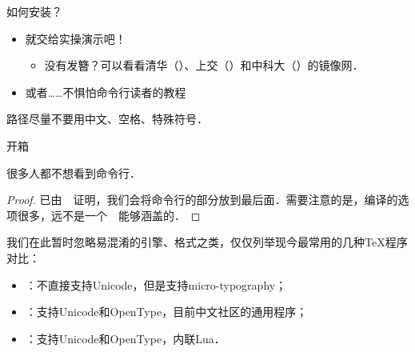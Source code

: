 \begin{frame}{如何安装？}
	\begin{itemize}
		\item 就交给实操演示吧！\pause
		      \begin{itemize}
			      \item 没有发簪？可以看看清华（）、上交（）和中科大（）的镜像网．
		      \end{itemize}\pause
		\item 或者……不惧怕命令行读者的教程~
	\end{itemize}
	\pause
	\begin{axiom}[安装路径]
		路径尽量不要用中文、空格、特殊符号．
	\end{axiom}
\end{frame}


\begin{frame}{开箱}
	\begin{theorem}[命令行]
		很多人都不想看到命令行．
	\end{theorem}
	\pause
	\begin{proof}
		已由~~证明，我们会将命令行的部分放到最后面．需要注意的是，编译的选项很多，远不是一个~\faPlay~能够涵盖的．
	\end{proof}
	\pause
	我们在此暂时忽略易混淆的引擎、格式之类，仅仅列举现今最常用的几种\TeX{}程序对比：\pause
	\begin{itemize}
		\item \pdfLaTeX：不直接支持Unicode，但是支持micro-typography；
		\item \XeLaTeX：支持Unicode和OpenType，目前中文社区的通用程序；
		\item \LuaLaTeX：支持Unicode和OpenType，内联Lua．
	\end{itemize}
\end{frame}


